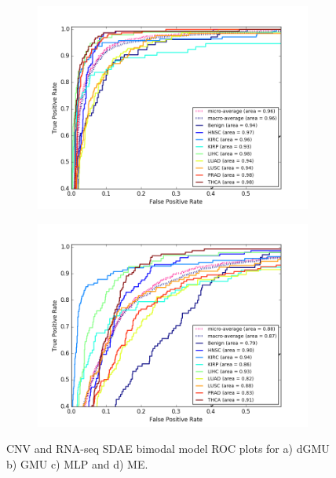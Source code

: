 \begin{figure}[H]
\begin{subfigure}[b]{0.49\textwidth}
         \includegraphics[width=\textwidth]{img/c_r/c_r_sdae_mlp_roc.png}
         \caption{}
     \end{subfigure}
     \begin{subfigure}[b]{0.49\textwidth}
         \centering
         \includegraphics[width=\textwidth]{img/c_r/c_r_sdae_moe_roc.png}
         \caption{}
     \end{subfigure}
        \caption{CNV and RNA-seq SDAE bimodal model ROC plots for a) dGMU b) GMU c) MLP and d) ME.}
        \label{fig:c_r_sdae_roc}
\end{figure}

